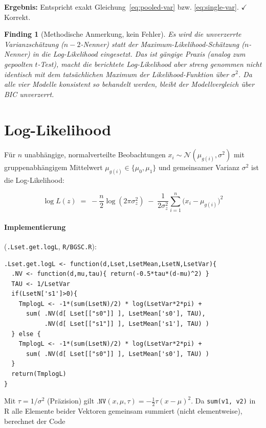 \documentclass[11pt,a4paper]{article}
\newtheorem{finding}{Finding}
\begin{document}
\textbf{Ergebnis:} Entspricht exakt Gleichung~\eqref{eq:pooled-var} bzw.
\eqref{eq:single-var}. $\checkmark$ Korrekt.

\begin{finding}[Methodische Anmerkung, kein Fehler]
Es wird die \emph{unverzerrte} Varianzschätzung ($n-2$-Nenner) statt der
Maximum-Likelihood-Schätzung ($n$-Nenner) in die Log-Likelihood
eingesetzt. Das ist gängige Praxis (analog zum gepoolten $t$-Test), macht die
berichtete Log-Likelihood aber streng genommen nicht identisch mit dem
tatsächlichen Maximum der Likelihood-Funktion über $\sigma^2$. Da alle vier
Modelle konsistent so behandelt werden, bleibt der Modellvergleich über BIC
unverzerrt.
\end{finding}

\section{Log-Likelihood}
\label{sec:loglik}

Für $n$ unabhängige, normalverteilte Beobachtungen $x_i \sim
\mathcal N(\mu_{g(i)}, \sigma^2)$ mit gruppenabhängigem Mittelwert
$\mu_{g(i)} \in \{\mu_0,\mu_1\}$ und gemeinsamer Varianz $\sigma^2$ ist die
Log-Likelihood:

\begin{equation}
\log L(z) \;=\; -\frac{n}{2}\log(2\pi\sigma_z^2)
              \;-\; \frac{1}{2\sigma_z^2}\sum_{i=1}^{n}\big(x_i-\mu_{g(i)}\big)^2
\label{eq:loglik}
\end{equation}

\paragraph{Implementierung} (\texttt{.Lset.get.logL}, \texttt{R/BGSC.R}):

\begin{lstlisting}
.Lset.get.logL <- function(d,Lset,LsetMean,LsetN,LsetVar){
  .NV <- function(d,mu,tau){ return(-0.5*tau*(d-mu)^2) }
  TAU <- 1/LsetVar
  if(LsetN['s1']>0){
    TmplogL <- -1*(sum(LsetN)/2) * log(LsetVar*2*pi) +
      sum( .NV(d[ Lset[["s0"]] ], LsetMean['s0'], TAU),
           .NV(d[ Lset[["s1"]] ], LsetMean['s1'], TAU) )
  } else {
    TmplogL <- -1*(sum(LsetN)/2) * log(LsetVar*2*pi) +
      sum( .NV(d[ Lset[["s0"]] ], LsetMean['s0'], TAU) )
  }
  return(TmplogL)
}
\end{lstlisting}

Mit $\tau = 1/\sigma^2$ (Präzision) gilt
$\texttt{.NV}(x,\mu,\tau) = -\tfrac12\tau(x-\mu)^2$. Da \texttt{sum(v1, v2)}
in R alle Elemente beider Vektoren gemeinsam summiert (nicht elementweise),
berechnet der Code
\end{document}
